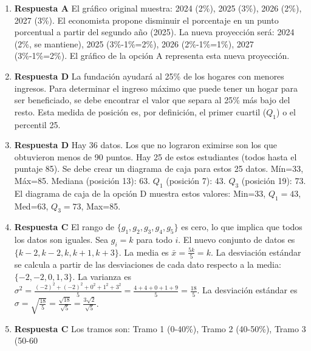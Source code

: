 \documentclass[11pt]{article}
\begin{document}
\begin{enumerate}
    \item \textbf{Respuesta A} El gráfico original muestra: 2024 (2\%), 2025 (3\%), 2026 (2\%), 2027 (3\%). El economista propone disminuir el porcentaje en un punto porcentual a partir del segundo año (2025). La nueva proyección será: 2024 (2\%, se mantiene), 2025 (3\%-1\%=2\%), 2026 (2\%-1\%=1\%), 2027 (3\%-1\%=2\%). El gráfico de la opción A representa esta nueva proyección. %
    
    \item \textbf{Respuesta D} La fundación ayudará al 25\% de los hogares con menores ingresos. Para determinar el ingreso máximo que puede tener un hogar para ser beneficiado, se debe encontrar el valor que separa al 25\% más bajo del resto. Esta medida de posición es, por definición, el primer cuartil ($Q_1$) o el percentil 25. %
    
    \item \textbf{Respuesta D} Hay 36 datos. Los que no lograron eximirse son los que obtuvieron menos de 90 puntos. Hay 25 de estos estudiantes (todos hasta el puntaje 85). Se debe crear un diagrama de caja para estos 25 datos. Mín=33, Máx=85. Mediana (posición 13): 63. $Q_1$ (posición 7): 43. $Q_3$ (posición 19): 73. El diagrama de caja de la opción D muestra estos valores: Min=33, $Q_1=43$, Med=63, $Q_3=73$, Max=85. %

    \item \textbf{Respuesta C} El rango de $\{g_1, g_2, g_3, g_4, g_5\}$ es cero, lo que implica que todos los datos son iguales. Sea $g_i = k$ para todo $i$. El nuevo conjunto de datos es $\{k-2, k-2, k, k+1, k+3\}$. La media es $\bar{x}=\frac{5k}{5}=k$. La desviación estándar se calcula a partir de las desviaciones de cada dato respecto a la media: $\{-2, -2, 0, 1, 3\}$. La varianza es $\sigma^2 = \frac{(-2)^2+(-2)^2+0^2+1^2+3^2}{5} = \frac{4+4+0+1+9}{5} = \frac{18}{5}$. La desviación estándar es $\sigma = \sqrt{\frac{18}{5}} = \frac{\sqrt{18}}{\sqrt{5}} = \frac{3\sqrt{2}}{\sqrt{5}}$. %
    
    \item \textbf{Respuesta C} Los tramos son: Tramo 1 (0-40\%), Tramo 2 (40-50\%), Tramo 3 (50-60%


\end{enumerate}
\end{document}
